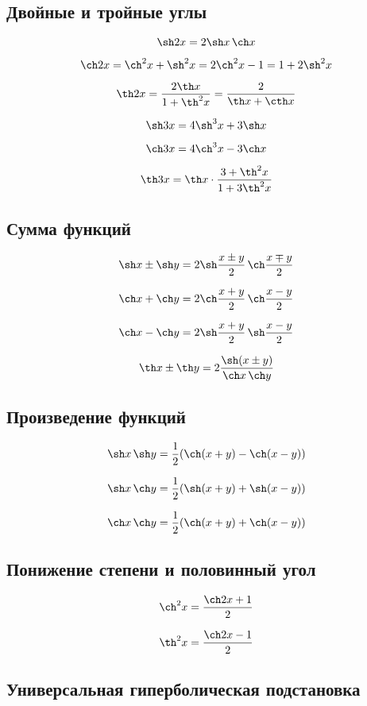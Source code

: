 \subsection{Двойные и тройные углы}

$$ \sh 2x = 2\sh x \, \ch x $$

$$ \ch 2x = \ch^2 x + \sh^2 x = 2\ch^2 x - 1 = 1 + 2\sh^2 x $$

$$ \th 2x = \frac{2\th x}{1 + \th^2 x} = \frac{2}{\th x + \cth x} $$

$$ \sh 3x = 4\sh^3 x + 3\sh x $$

$$ \ch 3x = 4\ch^3 x - 3\ch x $$

$$ \th 3x = \th x \cdot \frac{3+\th^2 x}{1 + 3\th^2 x} $$

\subsection{Сумма функций}

$$ \sh x \pm \sh y = 2\sh\frac{x\pm y}{2}\,\ch\frac{x\mp y}{2} $$

$$ \ch x + \ch y = 2\ch\frac{x+y}{2}\,\ch\frac{x-y}{2} $$

$$ \ch x - \ch y = 2\sh\frac{x+ y}{2}\,\sh\frac{x- y}{2} $$

$$ \th x \pm \th y = 2\frac{\sh(x\pm y)}{\ch x\, \ch y} $$

\subsection{Произведение функций}

$$ \sh x \, \sh y = \frac12(\ch(x+y)-\ch(x-y)) $$

$$ \sh x \, \ch y = \frac12(\sh(x+y)+\sh(x-y)) $$

$$ \ch x \, \ch y = \frac12(\ch(x+y)+\ch(x-y)) $$

\subsection{Понижение степени и половинный угол}

$$ \ch^2 x = \frac{\ch 2x+1}{2} $$

$$ \th^2 x = \frac{\ch 2x-1}{2} $$ 

\subsection{Универсальная гиперболическая подстановка}



